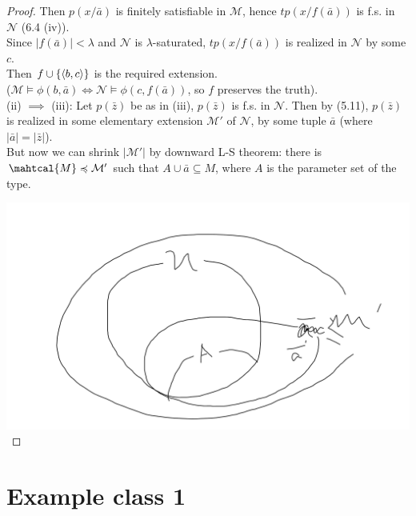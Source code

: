\documentclass[a4paper]{article}
\begin{document}
\begin{thm}
\begin{proof}
        Then $p(x/\bar{a})$ is finitely satisfiable in $\mathcal{M}$, hence $tp(x/f(\bar{a}))$ is f.s. in $\mathcal{N}$ (6.4 (iv)).\\
        Since $|f(\bar{a})| < \lambda$ and $\mathcal{N}$ is $\lambda$-saturated, $tp(x/f(\bar{a}))$ is realized in $\mathcal{N}$ by some $c$.\\
        Then $f \cup \{\langle b,c\rangle \}$ is the required extension.\\
        ($\mathcal{M} \vDash \phi(b,\bar{a}) \iff \mathcal{N} \vDash \phi(c,f(\bar{a}))$, so $f$ preserves the truth).\\
        (ii) $\implies$ (iii): Let $p(\bar{z})$ be as in (iii), $p(\bar{z})$ is f.s. in $\mathcal{N}$. Then by (5.11), $p(\bar{z})$ is realized in some elementary extension $\mathcal{M}'$ of $\mathcal{N}$, by some tuple $\bar{a}$ (where $|\bar{a}| = |\bar{z}|$).\\
        But now we can shrink $|\mathcal{M}'|$ by downward L-S theorem: there is $\mahtcal{M} \preccurlyeq\mathcal{M}'$ such that $A \cup \bar{a} \subseteq M$, where $A$ is the parameter set of the type.

        \includegraphics[scale=0.5]{image/Model_10.png}
    \end{proof}
\end{thm}




\newpage

\section{Example class 1}
\end{document}
